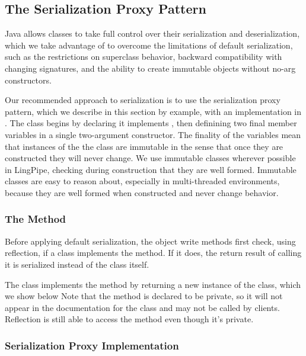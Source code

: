 \subsection{The Serialization Proxy Pattern}

Java allows classes to take full control over their serialization and
deserialization, which we take advantage of to overcome the
limitations of default serialization, such as the restrictions on
superclass behavior, backward compatibility with changing signatures,
and the ability to create immutable objects without no-arg constructors.

Our recommended approach to serialization is to use the serialization
proxy pattern, which we describe in this section by example, with an
implementation in .  The class begins by declaring
it implements , then definining two final member
variables in a single two-argument constructor.  
%
%
The finality of the variables mean that instances of the the class are
immutable in the sense that once they are constructed they will never
change.  We use immutable classes wherever possible in LingPipe,
checking during construction that they are well formed.  Immutable
classes are easy to reason about, especially in multi-threaded
environments, because they are well formed when constructed and never
change behavior.

\subsubsection{The  Method}

Before applying default serialization, the object write methods first
check, using reflection, if a class implements the
 method.  If it does, the return result of
calling it is serialized instead of the class itself.  

The  class implements the 
method by returning a new instance of the  class,
which we show below
%
%
Note that the method is declared to be private, so it will not appear
in the documentation for the class and may not be called by clients.
Reflection is still able to access the method even though it's
private. 

\subsubsection{Serialization Proxy Implementation}


